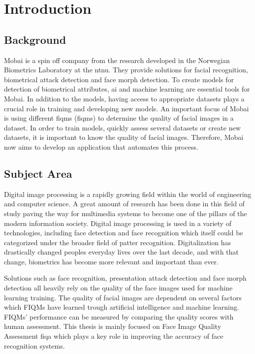 \chapter{Introduction}
\label{chap:Intro}

\section{Background}
\label{section:background}
Mobai is a spin off company from the research developed in the Norwegian Biometrics Laboratory at the \acrfull{ntnu}. They provide solutions for facial recognition, biometrical attack detection and face morph detection. To create models for detection of biometrical attributes, \acrlong{ai} and machine learning are essential tools for Mobai. In addition to the models, having access to appropriate datasets plays a crucial role in training and developing new models. An important focus of Mobai is using different \acrlong{fiqm}s (\acrshort{fiqm}s) to determine the quality of facial images in a dataset. In order to train models, quickly assess several datasets or create new datasets, it is important to know the quality of facial images. Therefore, Mobai now aims to develop an application that automates this process. 

\section{Subject Area}
Digital image processing is a rapidly growing field within the world of engineering and computer science. A great amount of research has been done in this field of study paving the way for multimedia systems to become one of the pillars of the modern information society. Digital image processing is used in a variety of technologies, including face detection and face recognition which itself could be categorized under the broader field of patter recognition. Digitalization has drastically changed peoples everyday lives over the last decade, and with that change, biometrics has become more relevant and important than ever. 

Solutions such as face recognition, presentation attack detection and face morph detection all heavily rely on the quality of the face images used for machine learning training. The quality of facial images are dependent on several factors which FIQMs have learned trough artificial intelligence and machine learning. FIQMs' performance can be measured by comparing the quality scores with human assessment. This thesis is mainly focused on Face Image Quality Assessment \acrshort{fiqa} which plays a key role in improving the accuracy of face recognition systems. 

